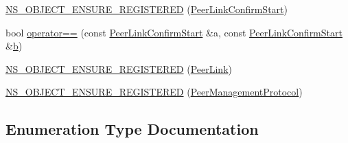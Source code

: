 \begin{DoxyCompactItemize}
\item 
\hyperlink{namespacens3_1_1dot11s_a17e08f89dd410fae9e376744881f9aaa}{N\+S\+\_\+\+O\+B\+J\+E\+C\+T\+\_\+\+E\+N\+S\+U\+R\+E\+\_\+\+R\+E\+G\+I\+S\+T\+E\+R\+ED} (\hyperlink{classns3_1_1dot11s_1_1PeerLinkConfirmStart}{Peer\+Link\+Confirm\+Start})
\item 
bool \hyperlink{namespacens3_1_1dot11s_a6f11ad6f9117372b86953b0f4eddffa1}{operator==} (const \hyperlink{classns3_1_1dot11s_1_1PeerLinkConfirmStart}{Peer\+Link\+Confirm\+Start} \&a, const \hyperlink{classns3_1_1dot11s_1_1PeerLinkConfirmStart}{Peer\+Link\+Confirm\+Start} \&\hyperlink{lte__pathloss_8m_a21ad0bd836b90d08f4cf640b4c298e7c}{b})
\item 
\hyperlink{namespacens3_1_1dot11s_ab34b3d1bf4b909da6885f97d23c17d2a}{N\+S\+\_\+\+O\+B\+J\+E\+C\+T\+\_\+\+E\+N\+S\+U\+R\+E\+\_\+\+R\+E\+G\+I\+S\+T\+E\+R\+ED} (\hyperlink{classns3_1_1dot11s_1_1PeerLink}{Peer\+Link})
\item 
\hyperlink{namespacens3_1_1dot11s_acfc0b4650ed5a7f67c632df04dcd2fe0}{N\+S\+\_\+\+O\+B\+J\+E\+C\+T\+\_\+\+E\+N\+S\+U\+R\+E\+\_\+\+R\+E\+G\+I\+S\+T\+E\+R\+ED} (\hyperlink{classns3_1_1dot11s_1_1PeerManagementProtocol}{Peer\+Management\+Protocol})
\end{DoxyCompactItemize}


\subsection{Enumeration Type Documentation}
